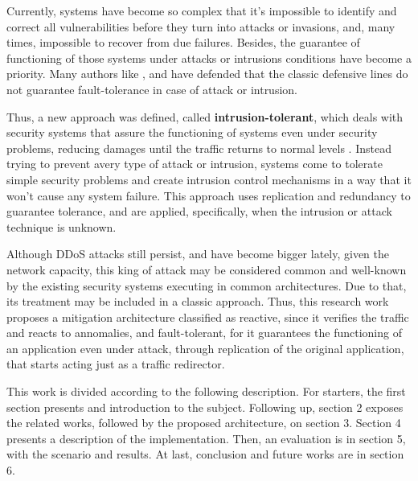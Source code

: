 Currently, systems have become so complex that it's impossible to identify and correct all vulnerabilities before they turn into attacks or invasions, and, many times, impossible to recover from due failures. Besides, the guarantee of functioning of those systems under attacks or intrusions conditions have become a priority. Many authors like \cite{Verissimo},  \cite{4796927} and \cite{1424871} have defended that the classic defensive lines do not guarantee fault-tolerance in case of attack or intrusion.

Thus, a new approach was defined, called \textbf{intrusion-tolerant}, which deals with security systems that assure the functioning of systems even under security problems, reducing damages until the traffic returns to normal levels \cite{Fraga_Powell_1985}. Instead trying to prevent avery type of attack or intrusion, systems come to tolerate simple security problems and create intrusion control mechanisms in a way that it won't cause any system failure. This approach uses replication and redundancy to guarantee tolerance, and are applied, specifically, when the intrusion or attack technique is unknown.
  
Although DDoS attacks still persist, and have become bigger lately, given the network capacity, this king of attack may be considered common and well-known by the existing security systems executing in common architectures. Due to that, its treatment may be included in a classic approach. Thus, this research work proposes a mitigation architecture classified as reactive, since it verifies the traffic and reacts to annomalies, and fault-tolerant, for it guarantees the functioning of an application even under attack, through replication of the original application, that starts acting just as a traffic redirector.

This work is divided according to the following description. For starters, the first section presents and introduction to the subject. Following up, section 2 exposes the related works, followed by the proposed architecture, on section 3. Section 4 presents a description of the implementation. Then, an evaluation is in section 5, with the scenario and results. At last, conclusion and future works are in section 6.